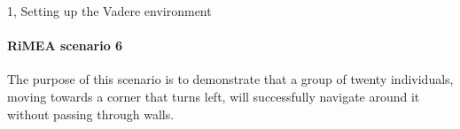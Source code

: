 \begin{task}{1, Setting up the Vadere environment}
\paragraph{RiMEA scenario 6}
The purpose of this scenario is to demonstrate that a group of twenty individuals, moving towards a corner that turns left, will successfully navigate around it without passing through walls.

\begin{figure}[H] 
\centering
{}

\end{figure}
\end{task}
